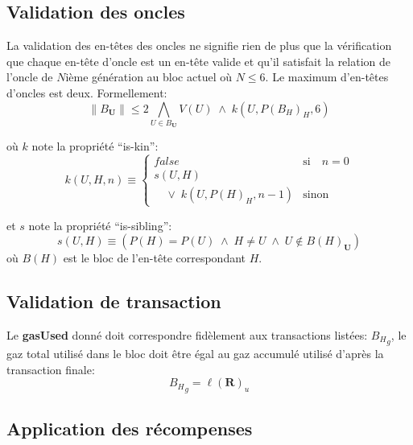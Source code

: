 \documentclass[9pt,oneside]{amsart}
\begin{document}
\begin{multicols}{2}
\subsection{Validation des oncles}

La validation des en-têtes des oncles ne signifie rien de plus que la vérification que chaque en-tête d'oncle est un en-tête valide et qu'il satisfait la relation de l'oncle de $N$ième génération au bloc actuel où $N \leq 6$. Le maximum d'en-têtes d'oncles est deux. Formellement:
\begin{equation}
\lVert B_\mathbf{U} \rVert \leqslant 2 \bigwedge_{U \in B_\mathbf{U}} V(U) \; \wedge \; k(U, P(B_H)_H, 6)
\end{equation}

où $k$ note la propriété ``is-kin'':
\begin{equation}
k(U, H, n) \equiv \begin{cases} false & \text{si} \quad n = 0 \\
s(U, H) &\\
\quad \vee \; k(U, P(H)_H, n - 1) & \text{sinon}
\end{cases}
\end{equation}

et $s$ note la propriété ``is-sibling'':
\begin{equation}
s(U, H) \equiv (P(H) = P(U)\; \wedge \; H \neq U \; \wedge \; U \notin B(H)_\mathbf{U})
\end{equation}
où $B(H)$ est le bloc de l'en-tête correspondant $H$.

\subsection{Validation de transaction}


Le \textbf{gasUsed} donné doit correspondre fidèlement aux transactions listées:  ${B_H}_g$, le gaz total  utilisé dans le bloc doit être égal au gaz accumulé utilisé d'après la transaction finale:
\begin{equation}
{B_H}_g = \ell(\mathbf{R})_u
\end{equation}

\subsection{Application des récompenses}


\end{multicols}
\end{document}

